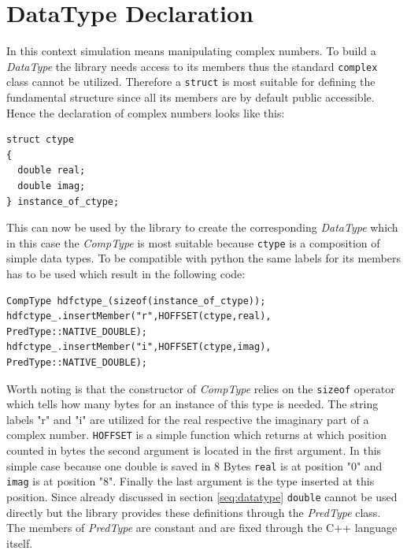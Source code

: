 \section{DataType Declaration}
\label{seq:datatypedec}
In this context simulation means manipulating complex numbers. To build a \textit{DataType} the library needs access to its members thus the standard \texttt{complex} class cannot be utilized. Therefore a \texttt{struct} is most suitable for defining the fundamental structure since all its members are by default public accessible. Hence the declaration of complex numbers looks like this:
\begin{lstlisting}
struct ctype
{
  double real;
  double imag;
} instance_of_ctype;
\end{lstlisting}
This can now be used by the library to create the corresponding \textit{DataType} which in this case the \textit{CompType} is most suitable because \texttt{ctype} is a composition of simple data types. To be compatible with python the same labels for its members has to be used which result in the following code:
\begin{lstlisting}
CompType hdfctype_(sizeof(instance_of_ctype));
hdfctype_.insertMember("r",HOFFSET(ctype,real), PredType::NATIVE_DOUBLE);
hdfctype_.insertMember("i",HOFFSET(ctype,imag), PredType::NATIVE_DOUBLE);
\end{lstlisting}
Worth noting is that the constructor of \textit{CompType} relies on the \texttt{sizeof} operator which tells how many bytes for an instance of this type is needed. The string labels "r" and "i" are utilized for the real respective the imaginary part of a complex number. \texttt{HOFFSET} is a simple function which returns at which position counted in bytes the second argument is located in the first argument. In this simple case because one double is saved in $8$ Bytes \texttt{real} is at position "0" and \texttt{imag} is at position "8". Finally the last argument is the type inserted at this position. Since already discussed in section \ref{seq:datatype} \texttt{double} cannot be used directly but the library provides these definitions through the \textit{PredType} class. The members of \textit{PredType} are constant and are fixed through the C++ language itself.\\


